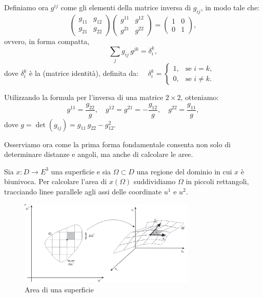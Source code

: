 Definiamo ora $g^{ij}$ come gli elementi della matrice inversa di $g_{ij}$, in modo tale che:
\vspace{0.4em}
$$
\begin{pmatrix}
    g_{11} & g_{12} \\
    g_{21} & g_{22}
\end{pmatrix}
\begin{pmatrix}
    g^{11} & g^{12} \\
    g^{21} & g^{22}
\end{pmatrix}
=
\begin{pmatrix}
    1 & 0 \\
    0 & 1
\end{pmatrix},
$$
ovvero, in forma compatta,
$$
\sum_{j} g_{ij}\,g^{jk} = \delta_i^k,
$$
dove $\delta_i^k$ è la  (matrice identità), definita da: 
$
\quad
\delta_i^k =
\begin{cases}
    1, & \text{se } i = k, \\
    0, & \text{se } i \neq k.
\end{cases}
$

Utilizzando la formula per l'inversa di una matrice $2\times2$, otteniamo:
\vspace{0.4em}
$$
g^{11} = \dfrac{g_{22}}{g},\quad g^{12} = g^{21} = -\dfrac{g_{12}}{g},\quad g^{22} = \dfrac{g_{11}}{g},
$$
dove $g = \det(g_{ij}) = g_{11}\,g_{22} - g_{12}^2$.

Osserviamo ora come la prima forma fondamentale consenta non solo di determinare distanze e angoli, ma anche di calcolare le aree.

Sia $x: D \to E^3$ una superficie e sia $\Omega\subset D$ una regione del dominio in cui $x$ è biunivoca. Per calcolare l'area di $x(\Omega)$ suddividiamo $\Omega$ in piccoli rettangoli, tracciando linee parallele agli assi delle coordinate $u^1$ e $u^2$.

\begin{figure}[H]
    \centering
    \includegraphics[width=0.75\textwidth]{assets/area.png}
    \caption{Area di una superficie}
\end{figure}

